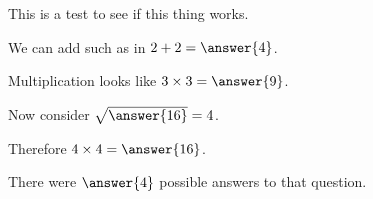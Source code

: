 \documentclass{ximera}
\begin{document}
This is a test to see if this thing works.

\begin{problem}
  We can add such as in $2 + 2 = \answer{4}$.
  
  \begin{problem}
    Multiplication looks like $3 \times 3 = \answer{9}$.
    
    \begin{problem}
      Now consider $\sqrt{\answer{16}} = 4$.
      
      \begin{problem}
        Therefore $4 \times 4 = \answer{16}$.
      \end{problem}
    \end{problem}
  \end{problem}
\end{problem}

\begin{problem}
  \begin{multipleChoice}
  \end{multipleChoice}

  \begin{problem}
    There were $\answer{4}$ possible answers to that question.

    \begin{problem}
      \begin{multipleChoice}
      \end{multipleChoice}
    \end{problem}
  \end{problem}
\end{problem}
\end{document}
